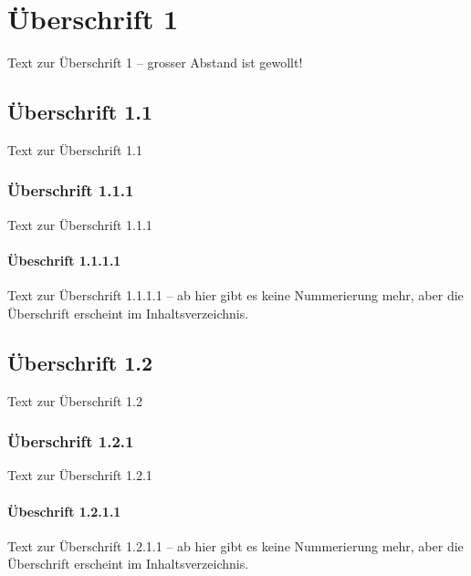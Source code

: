 \chapter{Überschrift 1}
\label{chap:chapter1}

Text zur Überschrift 1 – grosser Abstand ist gewollt!

\section{Überschrift 1.1}
\label{sec:section1}

Text zur Überschrift 1.1

\subsection{Überschrift 1.1.1}
\label{subsec:subsection1}

Text zur Überschrift 1.1.1

\subsubsection{Übeschrift 1.1.1.1}
\label{ssubsec:subsubsection1}

Text zur Überschrift 1.1.1.1 – ab hier gibt es keine Nummerierung mehr, aber die Überschrift erscheint im Inhaltsverzeichnis.

\section{Überschrift 1.2}
\label{sec:section2}

Text zur Überschrift 1.2

\subsection{Überschrift 1.2.1}
\label{subsec:subsection2}

Text zur Überschrift 1.2.1

\subsubsection{Übeschrift 1.2.1.1}
\label{ssubsec:subsubsection2}

Text zur Überschrift 1.2.1.1 – ab hier gibt es keine Nummerierung mehr, aber die Überschrift erscheint im Inhaltsverzeichnis.